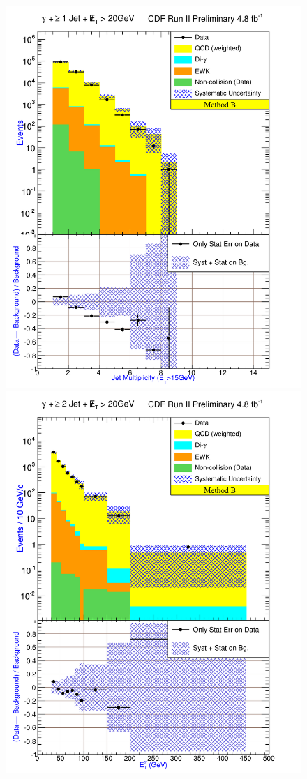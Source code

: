 \documentclass[12pt,twoside,letterpaper,doublespace]{article}
\begin{document}
\begin{figure}[h!]
{\includegraphics[keepaspectratio=true, scale=\figScale]{G30JetsMet20_MtdB_plot1_NJet.pdf}}
{\includegraphics[keepaspectratio=true, scale=\figScale]{G30JetsMet20_MtdB_plot2_Et_pho.pdf}}

\end{figure}
\end{document}
